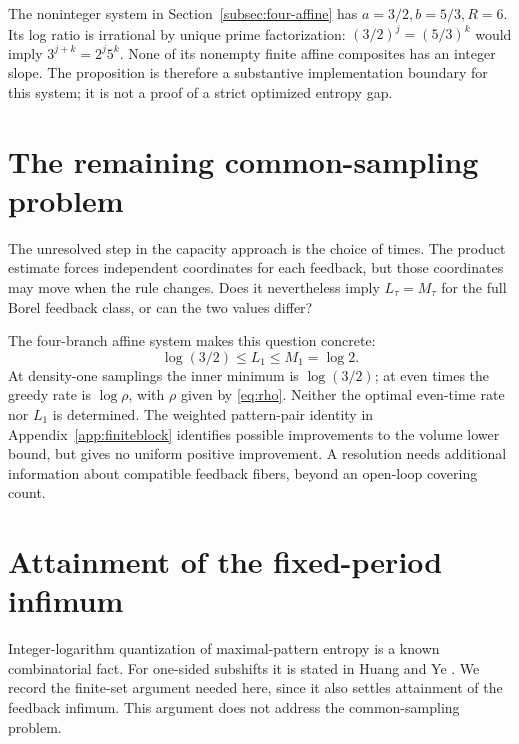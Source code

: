 \documentclass[11pt,reqno]{amsart}
\numberwithin{equation}{section}
\theoremstyle{definition}
\theoremstyle{definition}
\begin{document}
The noninteger system in Section~\ref{subsec:four-affine} has
$a=3/2,b=5/3,R=6$. Its log ratio is irrational by unique prime
factorization: $(3/2)^j=(5/3)^k$ would imply
$3^{j+k}=2^j5^k$. None of its nonempty finite affine composites
has an integer slope. The proposition is therefore a substantive
implementation boundary for this system; it is not a proof of a
strict optimized entropy gap.

\section{The remaining common-sampling problem}\label{app:scope}
The unresolved step in the capacity approach is the choice of times.
The product estimate forces independent coordinates for each
feedback, but those coordinates may move when the rule changes.
Does it nevertheless imply $L_\tau=M_\tau$ for the full Borel
feedback class, or can the two values differ?

The four-branch affine system makes this question concrete:
\[
 \log(3/2)\le L_1\le M_1=\log2.
\]
At density-one samplings the inner minimum is $\log(3/2)$; at even
times the greedy rate is $\log\rho$, with $\rho$ given by
\eqref{eq:rho}. Neither the optimal even-time rate nor $L_1$ is
determined. The weighted pattern-pair identity in
Appendix~\ref{app:finiteblock} identifies possible improvements to
the volume lower bound, but gives no uniform positive improvement.
A resolution needs additional information about compatible feedback
fibers, beyond an open-loop covering count.

\appendix

\section{Attainment of the fixed-period infimum}\label{app:minimum}

Integer-logarithm quantization of maximal-pattern entropy is a known
combinatorial fact. For one-sided subshifts it is stated in
Huang and Ye \cite[Theorem~5.5]{HuangYe2009}. We record the finite-set
argument needed here, since it also settles attainment of the feedback
infimum. This argument does not address the common-sampling problem.
\end{document}
